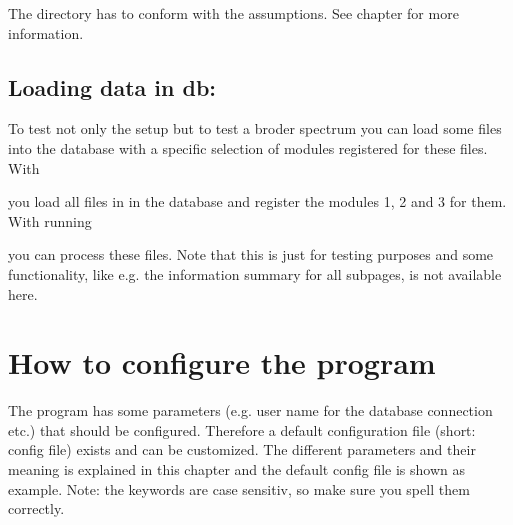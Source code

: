 \documentclass[letterpaper,10pt,english]{sphinxmanual}
\begin{document}
The directory has to conform with the assumptions. See chapter
{\hyperref[\detokenize{training:training}]{}} for more information.


\section{Loading data in db:}
\label{\detokenize{tutorial:loading-data-in-db}}
To test not only the setup but to test a broder spectrum you can load
some files into the database with a specific selection of modules
registered for these files. With

%
\begin{sphinxVerbatim}[commandchars=\\\{\}]
     
\end{sphinxVerbatim}

you load all files in  in the database and
register the modules 1, 2 and 3 for them. With running

%
\begin{sphinxVerbatim}[commandchars=\\\{\}]
  
\end{sphinxVerbatim}

you can process these files. Note that this is just for testing
purposes and some functionality, like e.g. the information summary for
all subpages, is not available here.


\chapter{How to configure the program}
\label{\detokenize{configuration:configuration}}\label{\detokenize{configuration::doc}}\label{\detokenize{configuration:how-to-configure-the-program}}
The program has some parameters (e.g. user name for the database
connection etc.) that should be configured. Therefore a default
configuration file (short: config file) exists and can be
customized. The different parameters and their meaning is explained in
this chapter and the default config file is shown as example. Note:
the keywords are case sensitiv, so make sure you spell them correctly.
\end{document}
